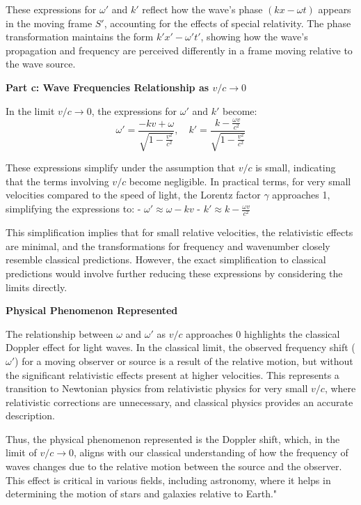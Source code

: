 These expressions for \( \omega' \) and \( k' \) reflect how the wave's phase \( (kx - \omega t) \) appears in the moving frame \( S' \), accounting for the effects of special relativity. The phase transformation maintains the form \( k'x' - \omega' t' \), showing how the wave's propagation and frequency are perceived differently in a frame moving relative to the wave source.

\textbf{Part c: Wave Frequencies Relationship as \( v/c \rightarrow 0 \)}

In the limit \( v/c \rightarrow 0 \), the expressions for \( \omega' \) and \( k' \) become:
\[
\omega' = \frac{-kv + \omega}{\sqrt{1 - \frac{v^2}{c^2}}}, \quad k' = \frac{k - \frac{\omega v}{c^2}}{\sqrt{1 - \frac{v^2}{c^2}}}
\]

These expressions simplify under the assumption that \( v/c \) is small, indicating that the terms involving \( v/c \) become negligible. In practical terms, for very small velocities compared to the speed of light, the Lorentz factor \( \gamma \) approaches 1, simplifying the expressions to:
- \( \omega' \approx \omega - kv \)
- \( k' \approx k - \frac{\omega v}{c^2} \)

This simplification implies that for small relative velocities, the relativistic effects are minimal, and the transformations for frequency and wavenumber closely resemble classical predictions. However, the exact simplification to classical predictions would involve further reducing these expressions by considering the limits directly.

\textbf{Physical Phenomenon Represented}

The relationship between \( \omega \) and \( \omega' \) as \( v/c \) approaches 0 highlights the classical Doppler effect for light waves. In the classical limit, the observed frequency shift (\( \omega' \)) for a moving observer or source is a result of the relative motion, but without the significant relativistic effects present at higher velocities. This represents a transition to Newtonian physics from relativistic physics for very small \( v/c \), where relativistic corrections are unnecessary, and classical physics provides an accurate description.

Thus, the physical phenomenon represented is the Doppler shift, which, in the limit of \( v/c \rightarrow 0 \), aligns with our classical understanding of how the frequency of waves changes due to the relative motion between the source and the observer. This effect is critical in various fields, including astronomy, where it helps in determining the motion of stars and galaxies relative to Earth."



